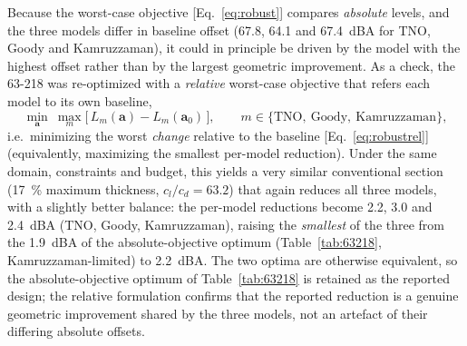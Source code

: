 \documentclass[preprint,3p,times]{elsarticle}
\begin{document}
Because the worst-case objective [Eq.~\eqref{eq:robust}] compares \emph{absolute}
levels, and the three models differ in baseline offset (\SI{67.8}{}, \SI{64.1}{}
and \SI{67.4}{dBA} for TNO, Goody and Kamruzzaman), it could in principle be
driven by the model with the highest offset rather than by the largest
geometric improvement. As a check, the 63-218 was re-optimized with a
\emph{relative} worst-case objective that refers each model to its own baseline,
\begin{equation}
\min_{\mathbf a}\ \max_m\bigl[\,L_m(\mathbf a)-L_m(\mathbf a_0)\,\bigr],
\qquad m\in\{\mathrm{TNO,\ Goody,\ Kamruzzaman}\},
\label{eq:robustrel}
\end{equation}
i.e.\ minimizing the worst \emph{change} relative to the baseline
[Eq.~\eqref{eq:robustrel}] (equivalently, maximizing the smallest per-model
reduction). Under the same domain, constraints
and budget, this yields a very similar conventional section
(\SI{17}{\percent} maximum thickness, $c_l/c_d=63.2$) that again reduces all
three models, with a slightly better balance: the per-model reductions become
\SI{2.2}{}, \SI{3.0}{} and \SI{2.4}{dBA} (TNO, Goody, Kamruzzaman), raising the
\emph{smallest} of the three from the \SI{1.9}{dBA} of the absolute-objective
optimum (Table~\ref{tab:63218}, Kamruzzaman-limited) to \SI{2.2}{dBA}. The two
optima are otherwise equivalent, so the absolute-objective optimum of
Table~\ref{tab:63218} is retained as the reported design; the relative
formulation confirms that the reported reduction is a genuine geometric
improvement shared by the three models, not an artefact of their differing
absolute offsets.
\end{document}
